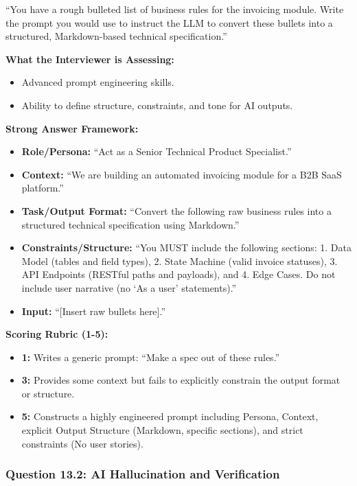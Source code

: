\documentclass[
  11pt,
  openany,
  oneside]{book}
\providecommand{\tightlist}{%
  \setlength{\itemsep}{0pt}\setlength{\parskip}{0pt}}
\begin{document}
``You have a rough bulleted list of business rules for the invoicing
module. Write the prompt you would use to instruct the LLM to convert
these bullets into a structured, Markdown-based technical
specification.''

\textbf{What the Interviewer is Assessing:}

\begin{itemize}
\tightlist
\item
  Advanced prompt engineering skills.
\item
  Ability to define structure, constraints, and tone for AI outputs.
\end{itemize}

\textbf{Strong Answer Framework:}

\begin{itemize}
\tightlist
\item
  \textbf{Role/Persona:} ``Act as a Senior Technical Product
  Specialist.''
\item
  \textbf{Context:} ``We are building an automated invoicing module for
  a B2B SaaS platform.''
\item
  \textbf{Task/Output Format:} ``Convert the following raw business
  rules into a structured technical specification using Markdown.''
\item
  \textbf{Constraints/Structure:} ``You MUST include the following
  sections: 1. Data Model (tables and field types), 2. State Machine
  (valid invoice statuses), 3. API Endpoints (RESTful paths and
  payloads), and 4. Edge Cases. Do not include user narrative (no `As a
  user' statements).''
\item
  \textbf{Input:} ``{[}Insert raw bullets here{]}.''
\end{itemize}

\textbf{Scoring Rubric (1-5):}

\begin{itemize}
\tightlist
\item
  \textbf{1:} Writes a generic prompt: ``Make a spec out of these
  rules.''
\item
  \textbf{3:} Provides some context but fails to explicitly constrain
  the output format or structure.
\item
  \textbf{5:} Constructs a highly engineered prompt including Persona,
  Context, explicit Output Structure (Markdown, specific sections), and
  strict constraints (No user stories).
\end{itemize}

\subsubsection{Question 13.2: AI Hallucination and
Verification}\label{question-13.2-ai-hallucination-and-verification}
\end{document}
